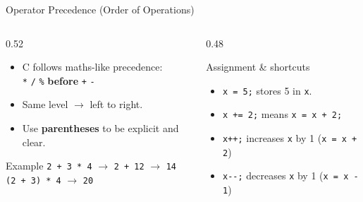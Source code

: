 \documentclass[aspectratio=169]{beamer}
\begin{document}
	\begin{frame}{Operator Precedence (Order of Operations)}
		\begin{columns}[T]
			\begin{column}{0.52\textwidth}
				\begin{itemize}
					\item C follows maths-like precedence: \\[2pt]
					\centering \texttt{*}\; \texttt{/}\; \texttt{\%} \; \textbf{before} \; \texttt{+}\; \texttt{-}
					\item Same level $\rightarrow$ left to right.
					\item Use \textbf{parentheses} to be explicit and clear.
				\end{itemize}
				\vspace{0.3cm}
				\begin{block}{Example}
					\small
					\texttt{2 + 3 * 4} \; $\rightarrow$ \; \texttt{2 + 12} \; $\rightarrow$ \; \texttt{14} \\
					\texttt{(2 + 3) * 4} \; $\rightarrow$ \; \texttt{20}
				\end{block}
			\end{column}
			\begin{column}{0.48\textwidth}
				\begin{block}{Assignment \& shortcuts}
					\small
					\begin{itemize}
						\item \texttt{x = 5;} stores 5 in \texttt{x}.
						\item \texttt{x += 2;} means \texttt{x = x + 2;}
						\item \texttt{x++;} increases \texttt{x} by 1 (\texttt{x = x + 2})
						\item \texttt{x{-}{-};} decreases \texttt{x} by 1 (\texttt{x = x - 1})
					\end{itemize}
				\end{block}
			\end{column}
		\end{columns}
	\end{frame}
	
\end{document}
